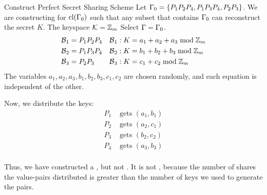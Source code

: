 \begin{example}{Construct Perfect Secret Sharing Scheme}
  Let $\operatorname{\Gamma}_{0} = \lbrace P_{1}P_{2}P_{4}, P_{1}P_{3}P_{4}, P_{2}P_{3} \rbrace$.
  We are constructing for $\operatorname{\text{cl}}(\operatorname{\Gamma}_{0})$ such that any subset that contains $\operatorname{\Gamma}_{0}$ can reconstruct the secret $K$.
  The keyspace $\operatorname{\mathcal{K}} = \operatorname{\mathbb{Z}}_{m}$
  \tcblower{}
  Select $\operatorname{\Gamma} = \operatorname{\Gamma}_{0}$.
  \begin{align*}
    \operatorname{\mathcal{B}}_{1} &= P_{1}P_{2}P_{4} & \operatorname{\mathcal{B}}_{1} &: K = a_{1} + a_{2} + a_{3} \bmod \operatorname{\mathbb{Z}}_{m} \\
    \operatorname{\mathcal{B}}_{2} &= P_{1}P_{3}P_{4} & \operatorname{\mathcal{B}}_{2} &: K = b_{1} + b_{2} + b_{3} \bmod \operatorname{\mathbb{Z}}_{m} \\
    \operatorname{\mathcal{B}}_{3} &= P_{2}P_{3} & \operatorname{\mathcal{B}}_{3} &: K = c_{1} + c_{2} \bmod \operatorname{\mathbb{Z}}_{m} \\
  \end{align*}
  The variables $a_{1}, a_{2}, a_{3}, b_{1}, b_{2}, b_{3}, c_{1}, c_{2}$ are chosen randomly, and each equation is independent of the other.

  Now, we distribute the keys:
  \begin{align*}
    P_{1} &\text{ gets } (a_{1}, b_{1}) \\
    P_{2} &\text{ gets } (a_{2}, c_{1}) \\
    P_{3} &\text{ gets } (b_{2}, c_{2}) \\
    P_{4} &\text{ gets } (a_{3}, b_{3}) \\
  \end{align*}

  Thus, we have constructed a , but not  .
  It is not , because the number of shares the value-pairs distributed is greater than the number of keys we used to generate the pairs.
\end{example}

